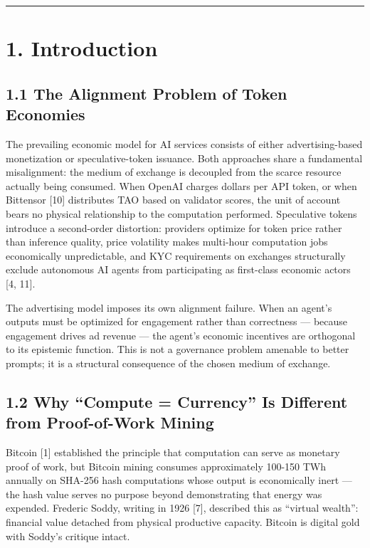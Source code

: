 \documentclass[
  11pt,
]{article}
\begin{document}
\begin{center}\rule{0.5\linewidth}{0.5pt}\end{center}

\section{1. Introduction}\label{introduction}

\subsection{1.1 The Alignment Problem of Token
Economies}\label{the-alignment-problem-of-token-economies}

The prevailing economic model for AI services consists of either
advertising-based monetization or speculative-token issuance. Both
approaches share a fundamental misalignment: the medium of exchange is
decoupled from the scarce resource actually being consumed. When OpenAI
charges dollars per API token, or when Bittensor {[}10{]} distributes
TAO based on validator scores, the unit of account bears no physical
relationship to the computation performed. Speculative tokens introduce
a second-order distortion: providers optimize for token price rather
than inference quality, price volatility makes multi-hour computation
jobs economically unpredictable, and KYC requirements on exchanges
structurally exclude autonomous AI agents from participating as
first-class economic actors {[}4, 11{]}.

The advertising model imposes its own alignment failure. When an agent's
outputs must be optimized for engagement rather than correctness ---
because engagement drives ad revenue --- the agent's economic incentives
are orthogonal to its epistemic function. This is not a governance
problem amenable to better prompts; it is a structural consequence of
the chosen medium of exchange.

\subsection{1.2 Why ``Compute = Currency'' Is Different from
Proof-of-Work
Mining}\label{why-compute-currency-is-different-from-proof-of-work-mining}

Bitcoin {[}1{]} established the principle that computation can serve as
monetary proof of work, but Bitcoin mining consumes approximately
100-150 TWh annually on SHA-256 hash computations whose output is
economically inert --- the hash value serves no purpose beyond
demonstrating that energy was expended. Frederic Soddy, writing in 1926
{[}7{]}, described this as ``virtual wealth'': financial value detached
from physical productive capacity. Bitcoin is digital gold with Soddy's
critique intact.
\end{document}
